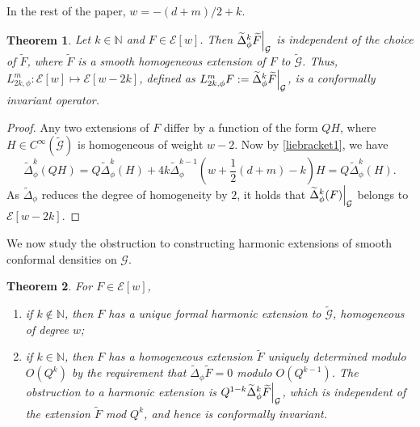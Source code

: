 \documentclass{amsart}
\newcommand\restr[2]{{%
  \left.\kern-\nulldelimiterspace %
  #1 %
  \right|_{#2} %
  }}
\newtheorem{theorem}{Theorem}[section]
\begin{document}
In the rest of the paper, $w=-(d+m)/2+k$. 
\begin{theorem}
Let $k\in\mathbb{N}$ and $F\in \mathcal{E}[w]$. Then $\restr{\widetilde{\Delta}_\phi^k\widetilde{F}}{{\mathcal{G}}}$ is independent of the choice of $\widetilde{F}$, where $\widetilde{F}$ is a smooth homogeneous extension of $F$ to $\widetilde{\mathcal{G}}$. Thus, $L_{2k,\phi}^m:\mathcal{E}[w]\mapsto \mathcal{E}[w-2k]$, defined as $L_{2k,\phi}^m F:=\restr{\widetilde{\Delta}_\phi^k\widetilde{F}}{\mathcal{G}}$, is a conformally invariant operator.
\end{theorem}
\begin{proof}
Any two extensions of $F$ differ by a function of the form $QH$, where $H\in C^\infty (\widetilde{\mathcal{G}})$ is homogeneous of weight $w-2$. Now by \cref{liebracket1}, we have \[\widetilde{\Delta}_\phi^k(QH)=Q\widetilde{\Delta}_\phi^k(H)+4k\widetilde{\Delta}_\phi^{k-1}(w+\frac{1}{2}(d+m)-k)H=Q\widetilde{\Delta}_\phi^k(H).\] As $\widetilde{\Delta}_\phi$ reduces the degree of homogeneity by $2$, it holds that $\restr{\widetilde{\Delta}_\phi^k(F)}{{\mathcal{G}}}$ belongs to $\mathcal{E}[w-2k]$.


\end{proof}
We now study the obstruction to constructing harmonic extensions of smooth conformal densities on $\mathcal{G}$.
\begin{theorem}
\label{gjmstheorem2}
For $F\in\mathcal{E}[w]$,
\begin{enumerate}
\item if $k\notin\mathbb{N}$, then $F$ has a unique formal harmonic extension to $\widetilde{\mathcal{G}}$, homogeneous of degree $w$;
\item if $k\in\mathbb{N}$, then $F$ has a homogeneous extension $\widetilde{F}$ uniquely determined modulo $O(Q^k)$ by the requirement that $\widetilde{\Delta}_\phi\widetilde{F}=0$ modulo $O(Q^{k-1})$. The obstruction to a harmonic extension is $\restr{Q^{1-k}\widetilde{\Delta}_\phi^k\widetilde{F}}{{\mathcal{G}}}$, which is independent of the extension $\widetilde{F}$ mod $Q^k$, and hence is conformally invariant.
\end{enumerate}
\end{theorem}
\end{document}
